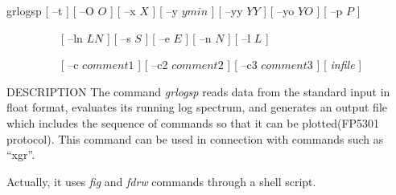 % 
% 
% 
% 
%                                                                        
%

\begin{synopsis}
\item[grlogsp] [ --t ] [ --O $O$ ] [ --x $X$ ] [ --y $ymin$ ] [ --yy $YY$ ]
	       [ --yo $YO$ ] [ --p $P$ ] 
\item[\ ~~~~~~~~] [ --ln $LN$ ] [ --s $S$ ] [ --e $E$ ] [ --n $N$ ] [ --l $L$ ] 
\item[\ ~~~~~~~~] [ --c $comment1$ ] [ --c2 $comment2$ ] [ --c3 $comment3$ ]
		  [ {\em infile} ]
\end{synopsis}

\begin{qsection}{DESCRIPTION}
The command {\em grlogsp} reads data from the standard input
in float format, evaluates its running log spectrum, and
generates an output file which includes the sequence of commands
so that it can be plotted(FP5301 protocol).
This command can be used in connection with commands such as ``xgr''.
\par
Actually, it uses {\em fig} and {\em fdrw} commands through a
shell script.
\end{qsection}

